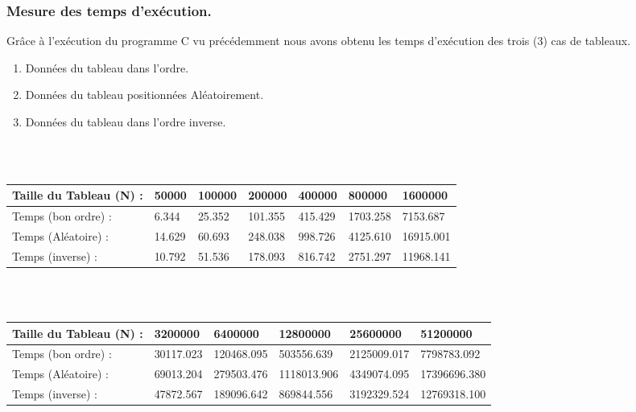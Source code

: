 \documentclass[12pt]{article}
\begin{document}
\subsubsection{Mesure des temps d'exécution.}
Grâce à l'exécution du programme C vu précédemment nous avons obtenu les temps d'exécution des trois (3) cas de tableaux.
\begin{enumerate}
	\item Données du tableau dans l'ordre.
	\item Données du tableau positionnées Aléatoirement.
	\item Données du tableau dans l'ordre inverse.
\end{enumerate}
\color{blue}
\textrm{  }
\\
\\
\begin{tabular}{|p{4cm}||p{1.8cm}|p{1.8cm}|p{1.8cm}|p{1.8cm}|p{1.8cm}|p{1.8cm}|}
\hline
Taille du Tableau (N) : & 50000 & 100000 & 200000 & 400000 & 800000  & 1600000\\
\hline
Temps (bon ordre) : & 6.344 & 25.352 & 101.355 & 415.429 & 1703.258 & 7153.687  \\
\hline

Temps (Aléatoire) : & 14.629 & 60.693 & 248.038 & 998.726 & 4125.610 & 16915.001\\
\hline

Temps (inverse) :  & 10.792 & 51.536 & 178.093 & 816.742 &  2751.297 & 11968.141  \\
\hline

\end{tabular}
\\
\\
\begin{tabular}{|p{4cm}||p{2.25cm}|p{2.25cm}|p{2.25cm}|p{2.25cm}|p{2.25cm}|}
\hline
Taille du Tableau (N) : & 3200000 & 6400000 & 12800000 & 25600000 &  51200000  \\
\hline

Temps (bon ordre) : &  30117.023 & 120468.095 & 503556.639 & 2125009.017 & 7798783.092   \\
\hline

Temps (Aléatoire) : & 69013.204 & 279503.476 & 1118013.906 & 4349074.095 & 17396696.380\\
\hline

Temps (inverse) : & 47872.567 & 189096.642 & 869844.556 & 3192329.524 & 12769318.100 \\
\hline

\end{tabular}
\color{black}
\end{document}
